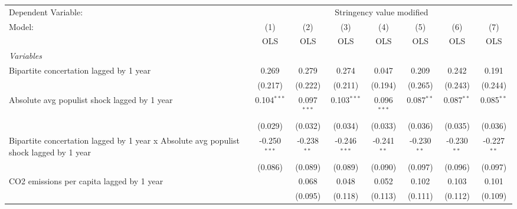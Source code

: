 
\begingroup
\centering
\begin{tabular}{lccccccc}
   \toprule
   Dependent Variable: & \multicolumn{7}{c}{Stringency value modified}\\
   Model:                                                                                 & (1)            & (2)           & (3)            & (4)           & (5)           & (6)           & (7)\\  
                                                                                          &  OLS           & OLS           & OLS            & OLS           & OLS           & OLS           & OLS\\  
   \midrule
   \emph{Variables}\\
   Bipartite concertation lagged by 1 year                                                & 0.269          & 0.279         & 0.274          & 0.047         & 0.209         & 0.242         & 0.191\\   
                                                                                          & (0.217)        & (0.222)       & (0.211)        & (0.194)       & (0.265)       & (0.243)       & (0.244)\\   
   Absolute avg populist shock lagged by 1 year                                           & 0.104$^{***}$  & 0.097$^{***}$ & 0.103$^{***}$  & 0.096$^{***}$ & 0.087$^{**}$  & 0.087$^{**}$  & 0.085$^{**}$\\   
                                                                                          & (0.029)        & (0.032)       & (0.034)        & (0.033)       & (0.036)       & (0.035)       & (0.036)\\   
   Bipartite concertation lagged by 1 year x Absolute avg populist shock lagged by 1 year & -0.250$^{***}$ & -0.238$^{**}$ & -0.246$^{***}$ & -0.241$^{**}$ & -0.230$^{**}$ & -0.230$^{**}$ & -0.227$^{**}$\\   
                                                                                          & (0.086)        & (0.089)       & (0.089)        & (0.090)       & (0.097)       & (0.096)       & (0.097)\\   
   CO2 emissions per capita lagged by 1 year                                              &                & 0.068         & 0.048          & 0.052         & 0.102         & 0.103         & 0.101\\   
                                                                                          &                & (0.095)       & (0.118)        & (0.113)       & (0.111)       & (0.112)       & (0.109)\\   

\end{tabular}
